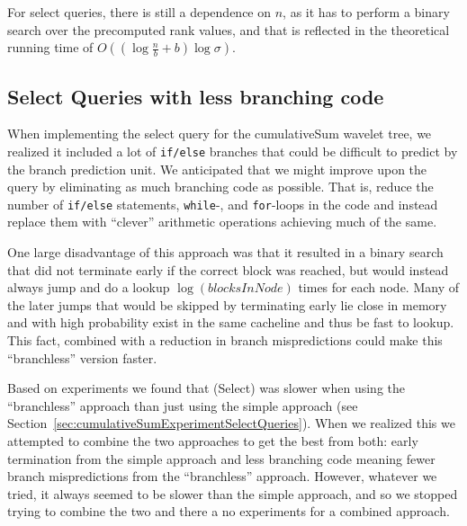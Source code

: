 For select queries, there is still a dependence on $n$, as it has to perform a binary search over the precomputed rank values, and that is reflected in the theoretical running time of $O((\log \frac{n}{b} + b) \log \sigma)$.

\subsection{Select Queries with less branching code}
When implementing the select query for the cumulativeSum wavelet tree, we realized it included a lot of \texttt{if/else} branches that could be difficult to predict by the branch prediction unit.
We anticipated that we might improve upon the query by eliminating as much branching code as possible.
That is, reduce the number of \texttt{if/else} statements, \texttt{while}-, and \texttt{for}-loops in the code and instead replace them with “clever” arithmetic operations achieving much of the same.

One large disadvantage of this approach was that it resulted in a binary search that did not terminate early if the correct block was reached, but would instead always jump and do a lookup $\log (\mathit{blocksInNode})$ times for each node.
Many of the later jumps that would be skipped by terminating early lie close in memory and with high probability exist in the same cacheline and thus be fast to lookup.
This fact, combined with a reduction in branch mispredictions could make this “branchless” version faster.

Based on experiments we found that \textproc(Select) was slower when using the “branchless” approach than just using the simple approach (see Section~\ref{sec:cumulativeSumExperimentSelectQueries}).
When we realized this we attempted to combine the two approaches to get the best from both: early termination from the simple approach and less branching code meaning fewer branch mispredictions from the “branchless” approach.
However, whatever we tried, it always seemed to be slower than the simple approach, and so we stopped trying to combine the two and there a no experiments for a combined approach.

